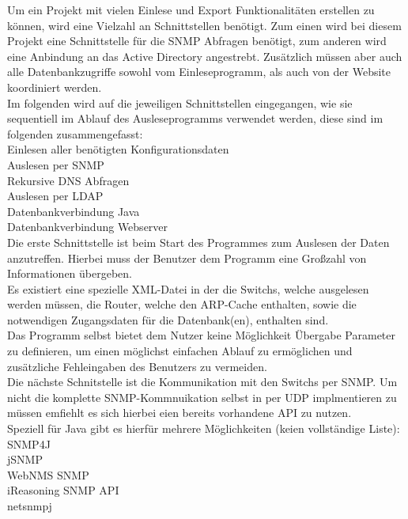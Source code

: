 Um ein Projekt mit vielen Einlese und Export Funktionalitäten erstellen zu können, wird eine Vielzahl an Schnittstellen benötigt.
Zum einen wird bei diesem Projekt eine Schnittstelle für die SNMP Abfragen benötigt, zum anderen wird eine Anbindung an das Active Directory angestrebt. Zusätzlich müssen aber auch alle Datenbankzugriffe sowohl vom Einleseprogramm, als auch von der Website koordiniert werden.\\
Im folgenden wird auf die jeweiligen Schnittstellen eingegangen, wie sie sequentiell im Ablauf des Ausleseprogramms verwendet werden, diese sind im folgenden zusammengefasst:\\
Einlesen aller benötigten Konfigurationsdaten\\
Auslesen per SNMP\\
Rekursive DNS Abfragen\\
Auslesen per LDAP\\
Datenbankverbindung Java\\
Datenbankverbindung Webserver\\


Die erste Schnittstelle ist beim Start des Programmes zum Auslesen der Daten anzutreffen. Hierbei muss der Benutzer dem Programm eine Großzahl von Informationen übergeben.\\
Es existiert eine spezielle XML-Datei in der die Switchs, welche ausgelesen werden müssen, die Router, welche den ARP-Cache enthalten, sowie die notwendigen Zugangsdaten für die Datenbank(en), enthalten sind. \\
Das Programm selbst bietet dem Nutzer keine Möglichkeit Übergabe Parameter zu definieren, um einen möglichst einfachen Ablauf zu ermöglichen und zusätzliche Fehleingaben des Benutzers zu vermeiden.\\
Die nächste Schnitstelle ist die Kommunikation mit den Switchs per SNMP. Um nicht die komplette SNMP-Kommnuikation selbst in per UDP implmentieren zu müssen emfiehlt es sich hierbei eien bereits vorhandene API zu nutzen.\\
Speziell für Java gibt es hierfür mehrere Möglichkeiten (keien vollständige Liste):\\
SNMP4J\\
jSNMP\\
WebNMS SNMP\\
iReasoning SNMP API\\
netsnmpj\\


